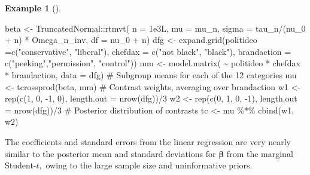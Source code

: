 \documentclass[
  11pt,
  letterpaper,
]{scrbook}
\newenvironment{Shaded}{\begin{snugshade}}{\end{snugshade}}
\newcommand{\AttributeTok}[1]{\textcolor[rgb]{0.40,0.45,0.13}{#1}}
\newcommand{\CommentTok}[1]{\textcolor[rgb]{0.37,0.37,0.37}{#1}}
\newcommand{\DecValTok}[1]{\textcolor[rgb]{0.68,0.00,0.00}{#1}}
\newcommand{\FloatTok}[1]{\textcolor[rgb]{0.68,0.00,0.00}{#1}}
\newcommand{\FunctionTok}[1]{\textcolor[rgb]{0.28,0.35,0.67}{#1}}
\newcommand{\NormalTok}[1]{\textcolor[rgb]{0.00,0.23,0.31}{#1}}
\newcommand{\OtherTok}[1]{\textcolor[rgb]{0.00,0.23,0.31}{#1}}
\newcommand{\SpecialCharTok}[1]{\textcolor[rgb]{0.37,0.37,0.37}{#1}}
\newcommand{\StringTok}[1]{\textcolor[rgb]{0.13,0.47,0.30}{#1}}
\theoremstyle{definition}
\newtheorem{example}{Example}[chapter]
\theoremstyle{plain}
\theoremstyle{plain}
\theoremstyle{plain}
\theoremstyle{definition}
\theoremstyle{definition}
\theoremstyle{plain}
\theoremstyle{plain}
\theoremstyle{remark}
\begin{document}
\begin{example}[]
\begin{Shaded}
\begin{Highlighting}[]
\NormalTok{beta }\OtherTok{\textless{}{-}}\NormalTok{ TruncatedNormal}\SpecialCharTok{::}\FunctionTok{rtmvt}\NormalTok{(}
  \AttributeTok{n =} \FloatTok{1e3}\NormalTok{L,}
  \AttributeTok{mu =}\NormalTok{ mu\_n, }
  \AttributeTok{sigma =}\NormalTok{ tau\_n}\SpecialCharTok{/}\NormalTok{(nu\_0 }\SpecialCharTok{+}\NormalTok{ n) }\SpecialCharTok{*}\NormalTok{ Omega\_n\_inv, }
  \AttributeTok{df =}\NormalTok{ nu\_0 }\SpecialCharTok{+}\NormalTok{ n)}
\NormalTok{dfg }\OtherTok{\textless{}{-}} \FunctionTok{expand.grid}\NormalTok{(}\AttributeTok{politideo =}\FunctionTok{c}\NormalTok{(}\StringTok{"conservative"}\NormalTok{, }\StringTok{"liberal"}\NormalTok{),}
            \AttributeTok{chefdax =} \FunctionTok{c}\NormalTok{(}\StringTok{"not black"}\NormalTok{, }\StringTok{"black"}\NormalTok{),}
            \AttributeTok{brandaction =} \FunctionTok{c}\NormalTok{(}\StringTok{"peeking"}\NormalTok{,}\StringTok{"permission"}\NormalTok{, }\StringTok{"control"}\NormalTok{))}
\NormalTok{mm }\OtherTok{\textless{}{-}} \FunctionTok{model.matrix}\NormalTok{( }\SpecialCharTok{\textasciitilde{}}\NormalTok{ politideo }\SpecialCharTok{*}\NormalTok{ chefdax }\SpecialCharTok{*}\NormalTok{ brandaction,}
              \AttributeTok{data =}\NormalTok{ dfg)}
\CommentTok{\# Subgroup means for each of the 12 categories}
\NormalTok{mu }\OtherTok{\textless{}{-}} \FunctionTok{tcrossprod}\NormalTok{(beta, mm)}
\CommentTok{\# Contrast weights, averaging over brandaction}
\NormalTok{w1 }\OtherTok{\textless{}{-}} \FunctionTok{rep}\NormalTok{(}\FunctionTok{c}\NormalTok{(}\DecValTok{1}\NormalTok{, }\DecValTok{0}\NormalTok{, }\SpecialCharTok{{-}}\DecValTok{1}\NormalTok{, }\DecValTok{0}\NormalTok{), }\AttributeTok{length.out =} \FunctionTok{nrow}\NormalTok{(dfg))}\SpecialCharTok{/}\DecValTok{3}
\NormalTok{w2 }\OtherTok{\textless{}{-}} \FunctionTok{rep}\NormalTok{(}\FunctionTok{c}\NormalTok{(}\DecValTok{0}\NormalTok{, }\DecValTok{1}\NormalTok{, }\DecValTok{0}\NormalTok{, }\SpecialCharTok{{-}}\DecValTok{1}\NormalTok{), }\AttributeTok{length.out =} \FunctionTok{nrow}\NormalTok{(dfg))}\SpecialCharTok{/}\DecValTok{3}
\CommentTok{\# Posterior distribution of contrasts}
\NormalTok{tc }\OtherTok{\textless{}{-}}\NormalTok{ mu }\SpecialCharTok{\%*\%} \FunctionTok{cbind}\NormalTok{(w1, w2)}
\end{Highlighting}
\end{Shaded}

The coefficients and standard errors from the linear regression are very
nearly similar to the posterior mean and standard deviations for
\(\boldsymbol{\beta}\) from the marginal Student-\(t,\) owing to the
large sample size and uninformative priors.


\end{example}
\end{document}
